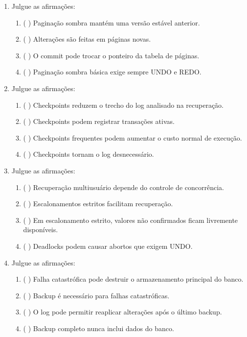 \documentclass[12pt,a4paper]{article}
\begin{document}
\begin{enumerate}[resume,label=\textbf{Q\arabic*.}]
\item Julgue as afirmações:

\begin{enumerate}[label=\alph*)]
    \item ( \quad ) Paginação sombra mantém uma versão estável anterior.
    \item ( \quad ) Alterações são feitas em páginas novas.
    \item ( \quad ) O commit pode trocar o ponteiro da tabela de páginas.
    \item ( \quad ) Paginação sombra básica exige sempre UNDO e REDO.
\end{enumerate}

\item Julgue as afirmações:

\begin{enumerate}[label=\alph*)]
    \item ( \quad ) Checkpoints reduzem o trecho do log analisado na recuperação.
    \item ( \quad ) Checkpoints podem registrar transações ativas.
    \item ( \quad ) Checkpoints frequentes podem aumentar o custo normal de execução.
    \item ( \quad ) Checkpoints tornam o log desnecessário.
\end{enumerate}

\item Julgue as afirmações:

\begin{enumerate}[label=\alph*)]
    \item ( \quad ) Recuperação multiusuário depende do controle de concorrência.
    \item ( \quad ) Escalonamentos estritos facilitam recuperação.
    \item ( \quad ) Em escalonamento estrito, valores não confirmados ficam livremente disponíveis.
    \item ( \quad ) Deadlocks podem causar abortos que exigem UNDO.
\end{enumerate}

\item Julgue as afirmações:

\begin{enumerate}[label=\alph*)]
    \item ( \quad ) Falha catastrófica pode destruir o armazenamento principal do banco.
    \item ( \quad ) Backup é necessário para falhas catastróficas.
    \item ( \quad ) O log pode permitir reaplicar alterações após o último backup.
    \item ( \quad ) Backup completo nunca inclui dados do banco.
\end{enumerate}

\end{enumerate}
\end{document}
